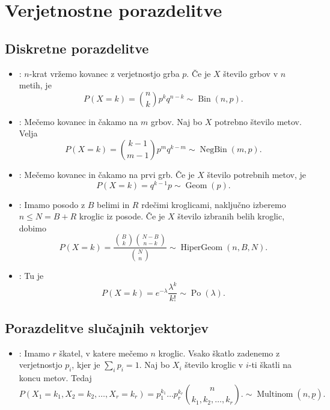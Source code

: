 \section{Verjetnostne porazdelitve}%
\label{sec:porazdelitve}

\subsection{Diskretne porazdelitve}

\begin{itemize}
\item {}:
  $n$-krat vržemo kovanec z verjetnostjo grba $p$.
  Če je $X$ število grbov v $n$ metih, je
  \[
	P(X = k) = \binom{n}{k} p^k q^{n-k}
	\sim \operatorname{Bin}(n, p).
  \]
\item {}:
  Mečemo kovanec in čakamo na $m$ grbov.
  Naj bo $X$ potrebno število metov.
  Velja
  \[
	P(X=k) = \binom{k-1}{m-1} p^m q^{k-m} \sim \operatorname{NegBin}(m, p).
  \]
\item {}:
  Mečemo kovanec in čakamo na prvi grb. Če je $X$ število potrebnih metov, je
  \[
	P(X = k) = q^{k-1}p \sim \operatorname{Geom}(p).
  \]
\item {}:
  Imamo posodo z $B$ belimi in $R$ rdečimi kroglicami, naključno izberemo $n \le
  N = B+R$ kroglic iz posode.
  Če je $X$ število izbranih belih kroglic, dobimo
  \[
	P(X = k) = \frac{\binom{B}{k} \binom{N-B}{n-k}}{\binom{N}{n}}
	\sim \operatorname{HiperGeom}(n, B, N).
  \]
\item {}:
  Tu je
  \[
	P(X = k) = e^{-\lambda} \frac{\lambda^k}{k!} \sim \operatorname{Po}(\lambda).
  \]
\end{itemize}

\subsection{Porazdelitve slučajnih vektorjev}

\begin{itemize}
\item {}:
  Imamo $r$ škatel, v katere mečemo $n$ kroglic.
  Vsako škatlo zadenemo z verjetnostjo $p_i$, kjer je $\sum_i p_i = 1$.
  Naj bo $X_i$ število kroglic v $i$-ti škatli na koncu metov.
  Tedaj
  \[
	P(X_1 = k_1, X_2 = k_2, \ldots, X_r = k_r)
	= p_1^{k_1} \ldots p_r^{k_r} \binom{n}{k_1, k_2, \ldots, k_r}.
	\sim \operatorname{Multinom}(n, \underline{p}).
  \]
\end{itemize}

